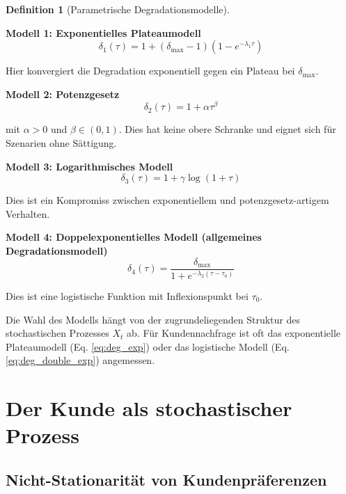 \documentclass[12pt, a4paper, titlepage]{report}
\theoremstyle{definition}
\newtheorem{definition}[theorem]{Definition}
\theoremstyle{remark}
\begin{document}
\begin{definition}[Parametrische Degradationsmodelle]
\label{def:degradation_forms}

\textbf{Modell 1: Exponentielles Plateaumodell}
\begin{equation}
\delta_1(\tau) = 1 + (\delta_{\max} - 1)(1 - e^{-\lambda_1 \tau})
\label{eq:deg_exp}
\end{equation}

Hier konvergiert die Degradation exponentiell gegen ein Plateau bei $\delta_{\max}$.

\textbf{Modell 2: Potenzgesetz}
\begin{equation}
\delta_2(\tau) = 1 + \alpha \tau^{\beta}
\label{eq:deg_power}
\end{equation}

mit $\alpha > 0$ und $\beta \in (0,1)$. Dies hat keine obere Schranke und eignet sich für Szenarien ohne Sättigung.

\textbf{Modell 3: Logarithmisches Modell}
\begin{equation}
\delta_3(\tau) = 1 + \gamma \log(1 + \tau)
\label{eq:deg_log}
\end{equation}

Dies ist ein Kompromiss zwischen exponentiellem und potenzgesetz-artigem Verhalten.

\textbf{Modell 4: Doppelexponentielles Modell (allgemeines Degradationsmodell)}
\begin{equation}
\delta_4(\tau) = \frac{\delta_{\max}}{1 + e^{-\lambda_2(\tau - \tau_0)}}
\label{eq:deg_double_exp}
\end{equation}

Dies ist eine logistische Funktion mit Inflexionspunkt bei $\tau_0$.

\end{definition}

Die Wahl des Modells hängt von der zugrundeliegenden Struktur des stochastischen Prozesses $X_t$ ab. Für Kundennachfrage ist oft das exponentielle Plateaumodell (Eq. \ref{eq:deg_exp}) oder das logistische Modell (Eq. \ref{eq:deg_double_exp}) angemessen.

\chapter{Der Kunde als stochastischer Prozess}
\label{sec:kunde}

\section{Nicht-Stationarität von Kundenpräferenzen}
\end{document}
